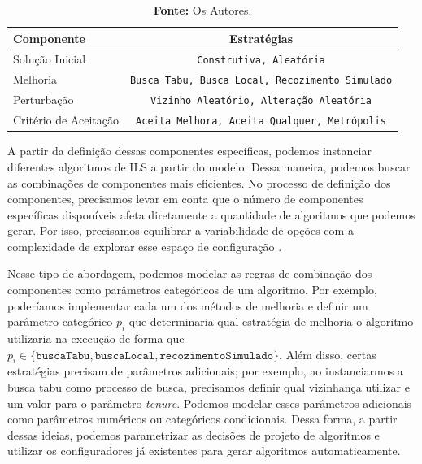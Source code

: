 \begin{table}[h!]
\centering
\caption{Estratégias disponíveis para cada componente da meta-heurística ILS}
\label{tab:estrategias_ils}
\begin{tabular}{lc}
\hline
\textbf{Componente} & \textbf{Estratégias}  \\ 
\hline
Solução Inicial             & \texttt{Construtiva, Aleatória} \\ 
Melhoria                     & \texttt{Busca Tabu, Busca Local, Recozimento Simulado}   \\
Perturbação                 & \texttt{Vizinho Aleatório, Alteração Aleatória}  \\
Critério de Aceitação       & \texttt{Aceita Melhora, Aceita Qualquer, Metrópolis}   \\
\hline
\end{tabular}
    \caption*{\small \textbf{Fonte:} Os Autores.}

\end{table}

A partir da definição dessas componentes específicas, podemos instanciar diferentes algoritmos de \ac{ILS} a partir do modelo. Dessa maneira, podemos buscar as combinações de componentes mais eficientes. No processo de definição dos componentes, precisamos levar em conta que o número de componentes específicas disponíveis afeta diretamente a quantidade de algoritmos que podemos gerar. Por isso, precisamos equilibrar a variabilidade de opções com a complexidade de explorar esse espaço de configuração \citep{souza2022automatic}.

Nesse tipo de abordagem, podemos modelar as regras de combinação dos componentes como parâmetros categóricos de um algoritmo. Por exemplo, poderíamos implementar cada um dos métodos de melhoria e definir um parâmetro categórico $p_i$ que determinaria qual estratégia de melhoria o algoritmo utilizaria na execução de forma que $p_i \in \{\texttt{buscaTabu}, \texttt{buscaLocal}, \texttt{recozimentoSimulado} \}$. Além disso, certas estratégias precisam de parâmetros adicionais; por exemplo, ao instanciarmos a busca tabu como processo de busca, precisamos definir qual vizinhança utilizar e um valor para o parâmetro \textit{tenure}. Podemos modelar esses parâmetros adicionais como parâmetros numéricos ou categóricos condicionais. Dessa forma, a partir dessas ideias, podemos parametrizar as decisões de projeto de algoritmos e utilizar os configuradores já existentes para gerar algoritmos automaticamente. \citep{souza2022automatic} 

